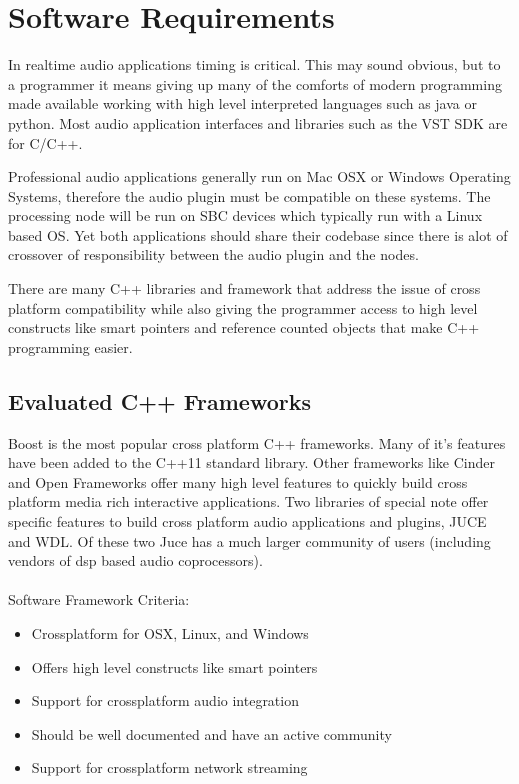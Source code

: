 \section{Software Requirements}

In realtime audio applications timing is critical. This may sound obvious, but to a programmer it means giving up many of the comforts of modern programming made available working with high level interpreted languages such as java or python. Most audio application interfaces and libraries such as the VST SDK are for C/C++.

Professional audio applications generally run on Mac OSX or Windows Operating Systems, therefore the audio plugin must be compatible on these systems. The processing node will be run on SBC devices which typically run with a Linux based OS. Yet both applications should share their codebase since there is alot of crossover of responsibility between the audio plugin and the nodes.

There are many C++ libraries and framework that address the issue of cross platform compatibility while also giving the programmer access to high level constructs like smart pointers and reference counted objects that make C++ programming easier.

\subsection{Evaluated C++ Frameworks}

Boost is the most popular cross platform C++ frameworks. Many of it's features have been added to the C++11 standard library. Other frameworks like Cinder and Open Frameworks offer many high level features to quickly build cross platform media rich interactive applications. Two libraries of special note offer specific features to build cross platform audio applications and plugins, JUCE and WDL. Of these two Juce has a much larger community of users (including vendors of dsp based audio coprocessors). \\
\\
\noindent
Software Framework Criteria:

\begin{itemize}

\item Crossplatform for OSX, Linux, and Windows
\item Offers high level constructs like smart pointers
\item Support for crossplatform audio integration
\item Should be well documented and have an active community
\item Support for crossplatform network streaming

\end{itemize}


